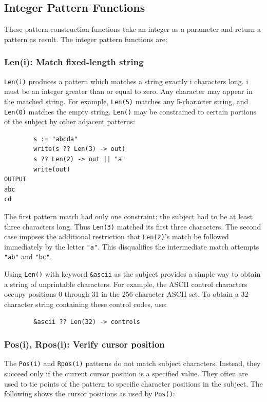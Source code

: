 \documentclass[letterpaper,12pt]{article}
\begin{document}
\subsection{Integer Pattern Functions}

These pattern construction functions take an integer as a parameter
and return a pattern as result. The integer pattern functions are:

\subsubsection{Len(i): Match fixed-length string}

{\tt Len(i)} produces a pattern which matches a string exactly i characters
long. i must be an integer greater than or equal to zero. Any
character may appear in the matched string. For example, {\tt Len(5)}
matches any 5-character string, and {\tt Len(0)} matches the empty
string. {\tt Len()} may be constrained to certain portions of the subject
by other adjacent patterns:

\begin{verbatim}
        s := "abcda"
        write(s ?? Len(3) -> out)
        s ?? Len(2) -> out || "a"
        write(out)
OUTPUT
abc
cd
\end{verbatim}

The first pattern match had only one constraint: the subject had
to be at least three characters long. Thus {\tt Len(3)} matched its first
three characters. The second case imposes the additional restriction
that {\tt Len(2)}'s match be followed immediately by the letter
{\tt "a"}. This disqualifies the intermediate match attempts
{\tt "ab"} and {\tt "bc"}.

Using {\tt Len()} with keyword {\tt \&ascii} as the subject provides a
simple way to obtain a string of unprintable characters. For example,
the ASCII control characters occupy positions 0 through 31 in the
256-character ASCII set. To obtain a 32-character string containing
these control codes, use:

\begin{verbatim}
        &ascii ?? Len(32) -> controls
\end{verbatim}

\subsubsection{Pos(i), Rpos(i): Verify cursor position}

The {\tt Pos(i)} and {\tt Rpos(i)} patterns do not match subject
characters. Instead, they succeed only if the current cursor position
is a specified value. They often are used to tie points of the pattern
to specific character positions in the subject. The following shows
the cursor positions as used by {\tt Pos()}:
\end{document}

